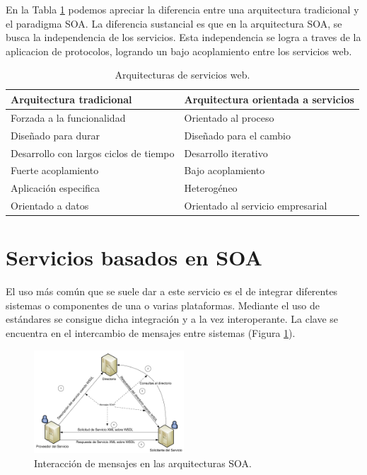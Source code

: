 \documentclass[conference]{IEEEtran}
\begin{document}
En la Tabla \ref{tab:soa-vs-trad} podemos apreciar la diferencia entre
una arquitectura tradicional y el paradigma SOA\cite{SOA2}. La
diferencia sustancial es que en la arquitectura SOA, se busca la
independencia de los servicios. Esta independencia se logra a traves
de la aplicacion de protocolos, logrando un bajo acoplamiento entre
los servicios web.

\begin{table}[!t]
  \renewcommand{\arraystretch}{1.3}
  \caption{Arquitecturas de servicios web.}
  \label{tab:soa-vs-trad}
  \centering
  \begin{tabular}{|l|l|}
    \hline
    \textbf{Arquitectura tradicional} & \textbf{Arquitectura orientada
      a servicios}\\
    \hline\hline
    Forzada a la funcionalidad & Orientado al proceso \\\hline
    Diseñado para durar & Diseñado para el cambio\\\hline
    Desarrollo con largos ciclos de tiempo & Desarrollo
    iterativo\\\hline
    Fuerte acoplamiento & Bajo acoplamiento \\\hline
    Aplicación especifica & Heterogéneo\\\hline
    Orientado a datos & Orientado al servicio empresarial\\
    \hline
  \end{tabular}
\end{table}



\section{Servicios basados en SOA}
\label{sec:serv-soa-based}

El uso más común que se suele dar a este servicio es el de integrar
diferentes sistemas o componentes de una o varias
plataformas. Mediante el uso de estándares se consigue dicha
integración y a la vez  interoperante. La clave se encuentra en el
intercambio de mensajes entre sistemas (Figura
\ref{fig:soa})\cite{SOA3}.


\begin{figure}[!t]
\centering
  \includegraphics[width=0.5\textwidth]{img/soa}
  \caption{Interacción de mensajes en las arquitecturas SOA.}
  \label{fig:soa}
\end{figure}
\end{document}
